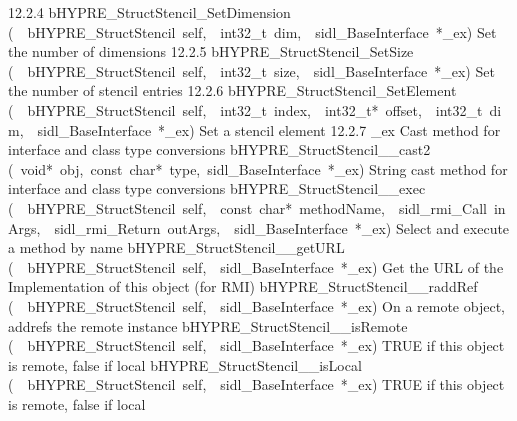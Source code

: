 \documentclass{article}
\begin{document}
\begin{cxxentry}
\begin{cxxentry}
\begin{cxxnames}
        {12.2.4}
        {bHYPRE\_StructStencil\_SetDimension}
        {(\ \ bHYPRE\_StructStencil\ self,\ \ int32\_t\ dim,\ \ sidl\_BaseInterface\ *\_ex)}
        {
Set the number of dimensions}
        {12.2.5}
        {bHYPRE\_StructStencil\_SetSize}
        {(\ \ bHYPRE\_StructStencil\ self,\ \ int32\_t\ size,\ \ sidl\_BaseInterface\ *\_ex)}
        {
Set the number of stencil entries}
        {12.2.6}
        {bHYPRE\_StructStencil\_SetElement}
        {(\ \ bHYPRE\_StructStencil\ self,\ \ int32\_t\ index,\ \ int32\_t*\ offset,\ \ int32\_t\ dim,\ \ sidl\_BaseInterface\ *\_ex)}
        {
Set a stencil element}
        {12.2.7}
        {\_ex}
        {}
        {
Cast method for interface and class type conversions}
        {}
\label{cxx.12.2.12}
        {bHYPRE\_StructStencil\_\_cast2}
        {(\ void*\ obj,\ const\ char*\ type,\ sidl\_BaseInterface\ *\_ex)}
        {
String cast method for interface and class type conversions}
        {}
\label{cxx.12.2.13}
        {bHYPRE\_StructStencil\_\_exec}
        {(\ \ bHYPRE\_StructStencil\ self,\ \ const\ char*\ methodName,\ \ sidl\_rmi\_Call\ inArgs,\ \ sidl\_rmi\_Return\ outArgs,\ \ sidl\_BaseInterface\ *\_ex)}
        {
Select and execute a method by name}
        {}
\label{cxx.12.2.14}
        {bHYPRE\_StructStencil\_\_getURL}
        {(\ \ bHYPRE\_StructStencil\ self,\ \ sidl\_BaseInterface\ *\_ex)}
        {
Get the URL of the Implementation of this object (for RMI)}
        {}
\label{cxx.12.2.15}
        {bHYPRE\_StructStencil\_\_raddRef}
        {(\ \ bHYPRE\_StructStencil\ self,\ \ sidl\_BaseInterface\ *\_ex)}
        {
On a remote object, addrefs the remote instance}
        {}
\label{cxx.12.2.16}
        {bHYPRE\_StructStencil\_\_isRemote}
        {(\ \ bHYPRE\_StructStencil\ self,\ \ sidl\_BaseInterface\ *\_ex)}
        {
TRUE if this object is remote, false if local}
        {}
\label{cxx.12.2.17}
        {bHYPRE\_StructStencil\_\_isLocal}
        {(\ \ bHYPRE\_StructStencil\ self,\ \ sidl\_BaseInterface\ *\_ex)}
        {
TRUE if this object is remote, false if local}
        {}
\label{cxx.12.2.18}

\end{cxxnames}
\end{cxxentry}
\end{cxxentry}
\end{document}
